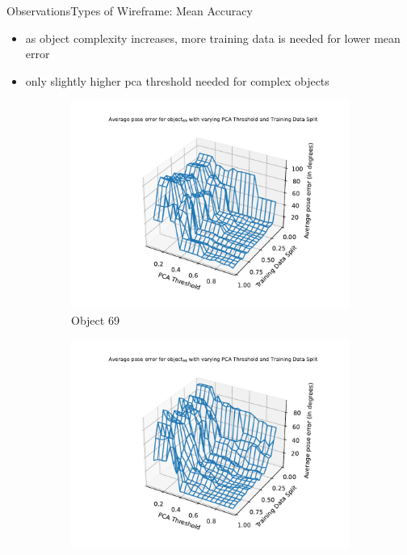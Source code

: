 \documentclass[aspectratio=169, handout, 10pt, hyperref=colorlinks]{beamer}
\begin{document}
\begin{frame}{Observations}{Types of Wireframe: Mean Accuracy}
\begin{itemize}
    \item as object complexity increases, more training data is needed for lower mean error
    \item only slightly higher pca threshold needed for complex objects
\end{itemize}
    \begin{figure}
        \centering
        \begin{subfigure}{0.32\linewidth}
            \centering
            \includegraphics[width=1.2\linewidth]{wireframe/error/69.pdf}
            \caption{Object 69}
        \end{subfigure}
        \begin{subfigure}{0.32\linewidth}
            \centering
            \includegraphics[width=1.2\linewidth]{wireframe/error/98.pdf}

\end{subfigure}
\end{figure}
\end{frame}
\end{document}

